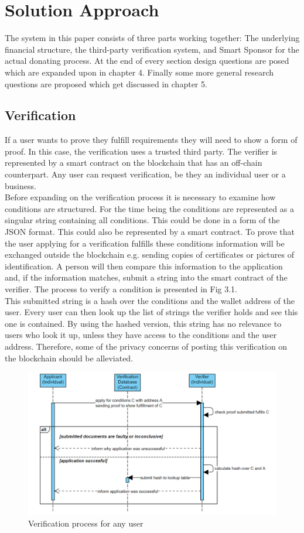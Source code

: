 \chapter{Solution Approach}
The system in this paper consists of three parts working together: The underlying financial structure, the third-party verification system, and Smart Sponsor for the actual donating process. At the end of every section design questions are posed which are expanded upon in chapter 4. Finally some more general research questions are proposed which get discussed in chapter 5.
\section{Verification}
If a user wants to prove they fulfill requirements they will need to show a form of proof. In this case, the verification uses a trusted third party. The verifier is represented by a smart contract on the blockchain that has an off-chain counterpart. Any user can request verification, be they an individual user or a business. \\
Before expanding on the verification process it is necessary to examine how conditions are structured. For the time being the conditions are represented as a singular string containing all conditions. This could be done in a form of the JSON format. This could also be represented by a smart contract. To prove that the user applying for a verification fulfills these conditions information will be exchanged outside the blockchain e.g. sending copies of certificates or pictures of identification. A person will then compare this information to the application and, if the information matches, submit a string into the smart contract of the verifier. The process to verify a condition is presented in Fig 3.1.\\
This submitted string is a hash over the conditions and the wallet address of the user. Every user can then look up the list of strings the verifier holds and see this one is contained. By using the hashed version, this string has no relevance to users who look it up, unless they have access to the conditions and the user address. Therefore, some of the privacy concerns of posting this verification on the blockchain should be alleviated.\\
\begin{figure}[H]
    \centering
    \includegraphics[scale=0.45]{figures/verification.PNG}  
    \caption{Verification process for any user}
    \label{fig:verifyModel}
\end{figure}
